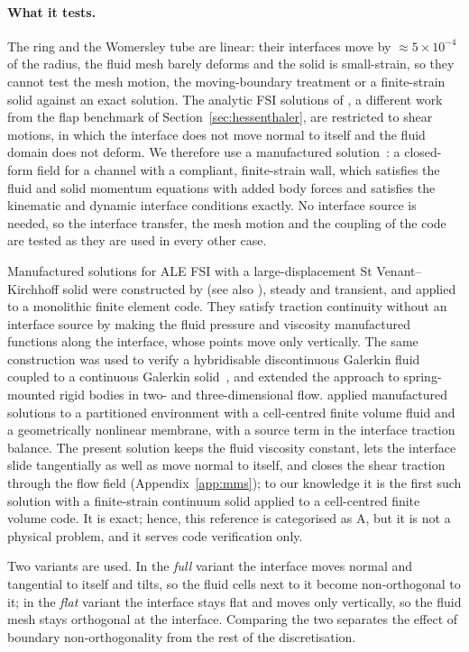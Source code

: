 \paragraph{What it tests.}
The ring and the Womersley tube are linear: their interfaces move by $\approx5\times10^{-4}$ of the radius, the fluid mesh barely deforms and the solid is small-strain, so they cannot test the mesh motion, the moving-boundary treatment or a finite-strain solid against an exact solution.
The analytic FSI solutions of \citet{Hessenthaler2020}, a different work from the flap benchmark of Section~\ref{sec:hessenthaler}, are restricted to shear motions, in which the interface does not move normal to itself and the fluid domain does not deform.
We therefore use a manufactured solution~\citep{Roache2002}: a closed-form field for a channel with a compliant, finite-strain wall, which satisfies the fluid and solid momentum equations with added body forces and satisfies the kinematic and dynamic interface conditions exactly.
No interface source is needed, so the interface transfer, the mesh motion and the coupling of the code are tested as they are used in every other case.

Manufactured solutions for ALE FSI with a large-displacement St Venant--Kirchhoff solid were constructed by \citet{Etienne2012} (see also \citet{Tremblay2006}), steady and transient, and applied to a monolithic finite element code.
They satisfy traction continuity without an interface source by making the fluid pressure and viscosity manufactured functions along the interface, whose points move only vertically.
The same construction was used to verify a hybridisable discontinuous Galerkin fluid coupled to a continuous Galerkin solid~\citep{LaSpina2020}, and \citet{Yu2015} extended the approach to spring-mounted rigid bodies in two- and three-dimensional flow.
\citet{Fisch2014} applied manufactured solutions to a partitioned environment with a cell-centred finite volume fluid and a geometrically nonlinear membrane, with a source term in the interface traction balance.
The present solution keeps the fluid viscosity constant, lets the interface slide tangentially as well as move normal to itself, and closes the shear traction through the flow field (Appendix~\ref{app:mms}); to our knowledge it is the first such solution with a finite-strain continuum solid applied to a cell-centred finite volume code.
It is exact; hence, this reference is categorised as A, but it is not a physical problem, and it serves code verification only.

Two variants are used.
In the \emph{full} variant the interface moves normal and tangential to itself and tilts, so the fluid cells next to it become non-orthogonal to it; in the \emph{flat} variant the interface stays flat and moves only vertically, so the fluid mesh stays orthogonal at the interface.
Comparing the two separates the effect of boundary non-orthogonality from the rest of the discretisation.

